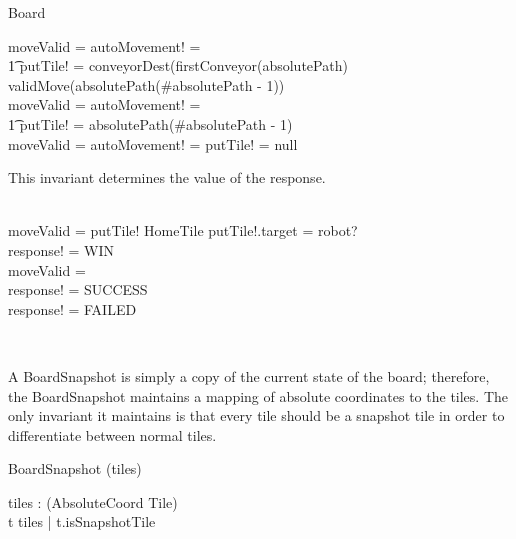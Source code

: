 \documentclass[12pt]{article}
\begin{document}
\begin{class}{Board}
\begin{notopschema}
\THEN moveValid = \true \wedge autoMovement! = \true \;\; \wedge \\ \t1 putTile! = conveyorDest(firstConveyor(absolutePath) \\
\ELSE \IF validMove(absolutePath(\#absolutePath - 1)) \\
\THEN moveValid = \true \wedge autoMovement! = \false \; \; \wedge \\ \t1  putTile! = absolutePath(\#absolutePath - 1) \\
\ELSE moveValid = \false \wedge autoMovement! = \false \wedge putTile! = null \\
\also \also \also
\begin{zpar}
This invariant determines the value of the response.
\end{zpar} \\
\IF moveValid = \true \wedge putTile! \in HomeTile \wedge putTile!.target = robot? \\
\THEN response! = WIN \\
\ELSE \IF moveValid = \true \\
\THEN response! = SUCCESS \\
\ELSE response! = FAILED
\end{notopschema} \\
\end{class}

A BoardSnapshot is simply a copy of the current state of the board; therefore, the BoardSnapshot maintains a mapping of absolute coordinates to the tiles. The only invariant it maintains is that every tile should be a snapshot tile in order to differentiate between normal tiles.
\begin{class}{BoardSnapshot}
\upharpoonright (tiles) \\
\begin{state}
tiles : \power (AbsoluteCoord \fun Tile) \\
\where
\forall t \ran tiles | t.isSnapshotTile
\end{state}
\end{class}
\end{document}
